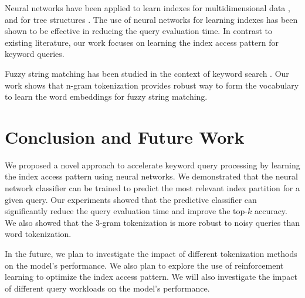\documentclass[conference]{IEEEtran}
\begin{document}
Neural networks have been applied to learn indexes for multidimensional data \cite{tsunamivldb,DBLP:conf/sigmod/NathanDAK20,ding2020alex}, and for tree structures \cite{ma2022film}.  The use of neural networks for learning indexes has been shown to be effective in reducing the query evaluation time.  In contrast to existing literature, our work focuses on learning the index access pattern for keyword queries.

Fuzzy string matching has been studied in the context of keyword search \cite{DBLP:conf/sigmod/NathanDAK20,DBLP:journals/corr/abs-2105-01601}.  Our work shows that n-gram tokenization provides robust way to form the vocabulary to learn the word embeddings for fuzzy string matching.

\section{Conclusion and Future Work}

We proposed a novel approach to accelerate keyword query processing by learning the index access pattern using neural networks.  We demonstrated that the neural network classifier can be trained to predict the most relevant index partition for a given query.  Our experiments showed that the predictive classifier can significantly reduce the query evaluation time and improve the top-$k$ accuracy.  We also showed that the 3-gram tokenization is more robust to noisy queries than word tokenization.

In the future, we plan to investigate the impact of different tokenization methods on the model's performance.  We also plan to explore the use of reinforcement learning to optimize the index access pattern.  We will also investigate the impact of different query workloads on the model's performance.




\end{document}
